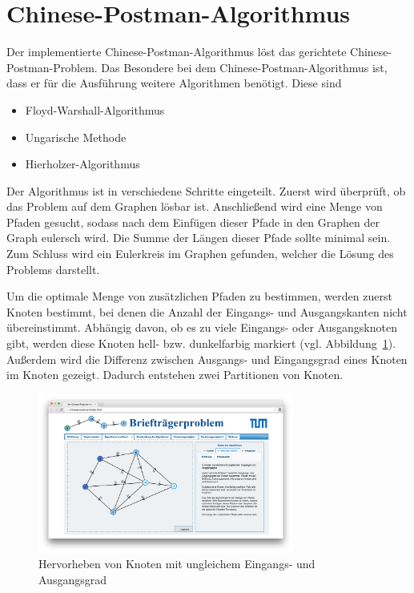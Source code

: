 \section{Chinese-Postman-Algorithmus} %
Der implementierte Chinese-Postman-Algorithmus löst das gerichtete Chinese-Postman-Problem. 
Das Besondere bei dem Chinese-Postman-Algorithmus ist, dass er für die Ausführung weitere Algorithmen benötigt. Diese sind 
\begin{itemize}
\item Floyd-Warshall-Algorithmus
\item Ungarische Methode
\item Hierholzer-Algorithmus
\end{itemize}
Der Algorithmus ist in verschiedene Schritte eingeteilt. Zuerst wird überprüft, ob das Problem auf dem Graphen lösbar ist. Anschließend wird eine Menge von Pfaden gesucht, sodass nach dem Einfügen dieser Pfade in den Graphen der Graph eulersch wird. Die Summe der Längen dieser Pfade sollte minimal sein.
Zum Schluss wird ein Eulerkreis im Graphen gefunden, welcher die Lösung des Problems darstellt.

Um die optimale Menge von zusätzlichen Pfaden zu bestimmen, werden zuerst Knoten bestimmt, bei denen die Anzahl der Eingangs- und Ausgangskanten nicht übereinstimmt.
Abhängig davon, ob es zu viele Eingangs- oder Ausgangsknoten gibt, werden diese Knoten hell- bzw. dunkelfarbig markiert (vgl. Abbildung~\ref{fig:postman_unbalanced}). Außerdem wird die Differenz zwischen Ausgangs- und Eingangsgrad eines Knoten im Knoten gezeigt. Dadurch entstehen zwei Partitionen von Knoten. 

\begin{figure}[h!]
	\centering
	\includegraphics[width=0.75\textwidth]{figures/postman_unbalanced}
	\caption[Chinese-Postman: Unbalancierte Knoten]{Hervorheben von Knoten mit ungleichem Eingangs- und Ausgangsgrad}\label{fig:postman_unbalanced}
\end{figure}

